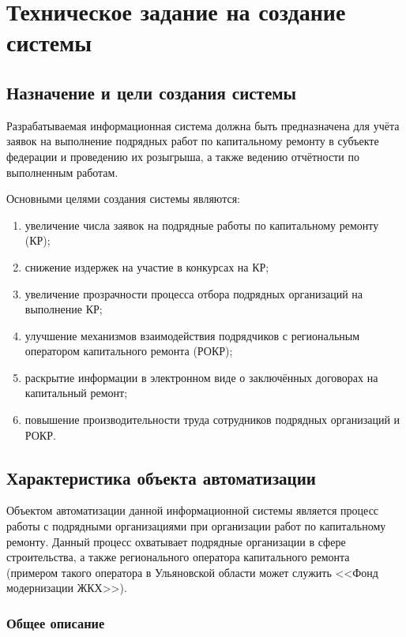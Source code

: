 \section{Техническое задание на создание системы}

\subsection{Назначение и цели создания системы}

Разрабатываемая информационная система должна быть предназначена для учёта заявок на выполнение подрядных работ по капитальному ремонту в субъекте федерации и проведению их розыгрыша, а также ведению отчётности по выполненным работам.

Основными целями создания системы являются:

\begin{enumerate}
	\item увеличение числа заявок на подрядные работы по капитальному ремонту (КР);
	\item снижение издержек на участие в конкурсах на КР;
	\item увеличение прозрачности процесса отбора подрядных организаций на выполнение КР;
	\item улучшение механизмов взаимодействия подрядчиков с региональным оператором капитального ремонта (РОКР);
	\item раскрытие информации в электронном виде о заключённых договорах на капитальный ремонт;
	\item повышение производительности труда сотрудников подрядных организаций и РОКР.
\end{enumerate}

\subsection{Характеристика объекта автоматизации}

Объектом автоматизации данной информационной системы является процесс работы с подрядными организациями при организации работ по капитальному ремонту.
Данный процесс охватывает подрядные организации в сфере строительства, а также регионального оператора капитального ремонта (примером такого оператора в Ульяновской области может служить <<Фонд модернизации ЖКХ>>).

\subsubsection{Общее описание}

